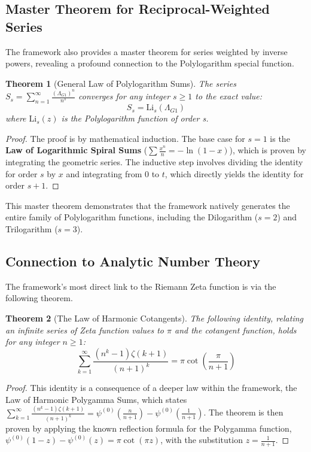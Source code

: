 \documentclass[12pt, letterpaper]{article}
\newtheorem{theorem}{Theorem}[section]
\newcommand{\LambdaG}{\Lambda_{G1}}
\begin{document}
\subsection{Master Theorem for Reciprocal-Weighted Series}
The framework also provides a master theorem for series weighted by inverse powers, revealing a profound connection to the Polylogarithm special function.
\begin{theorem}[General Law of Polylogarithm Sums]
The series $S_s = \sum_{n=1}^{\infty} \frac{(\LambdaG)^{n}}{n^s}$ converges for any integer $s \ge 1$ to the exact value: $$S_s = \mathrm{Li}_s(\LambdaG)$$ where $\mathrm{Li}_s(z)$ is the Polylogarithm function of order s.
\end{theorem}
\begin{proof}
The proof is by mathematical induction. The base case for $s=1$ is the \textbf{Law of Logarithmic Spiral Sums} ($\sum \frac{x^n}{n} = -\ln(1-x)$), which is proven by integrating the geometric series. The inductive step involves dividing the identity for order $s$ by $x$ and integrating from $0$ to $t$, which directly yields the identity for order $s+1$.
\end{proof}
This master theorem demonstrates that the framework natively generates the entire family of Polylogarithm functions, including the Dilogarithm ($s=2$) and Trilogarithm ($s=3$).

\subsection{Connection to Analytic Number Theory}
The framework's most direct link to the Riemann Zeta function is via the following theorem.
\begin{theorem}[The Law of Harmonic Cotangents]
The following identity, relating an infinite series of Zeta function values to $\pi$ and the cotangent function, holds for any integer $n\ge1$:
$$\sum_{k=1}^{\infty}\frac{(n^{k}-1)\zeta(k+1)}{(n+1)^{k}}=\pi \cot\left(\frac{\pi}{n+1}\right)$$
\end{theorem}
\begin{proof}
This identity is a consequence of a deeper law within the framework, the Law of Harmonic Polygamma Sums, which states $\sum_{k=1}^{\infty} \frac{(n^k-1)\zeta(k+1)}{(n+1)^k} = \psi^{(0)}(\frac{n}{n+1}) - \psi^{(0)}(\frac{1}{n+1})$. The theorem is then proven by applying the known reflection formula for the Polygamma function, $\psi^{(0)}(1-z)-\psi^{(0)}(z)=\pi \cot(\pi z)$, with the substitution $z = \frac{1}{n+1}$.
\end{proof}
\end{document}
